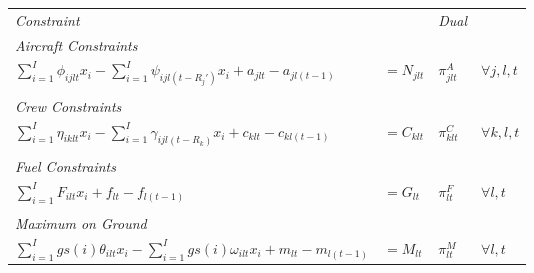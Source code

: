\begin{longtable}[h]{ll|l|l}
{\it Constraint} && {\it Dual} &\\
{\it Aircraft Constraints} &&&\\
$\displaystyle\sum_{i=1}^{I} \phi_{ijlt}x_i - \displaystyle\sum_{i=1}^{I} \psi_{ijl(t-R_{j}')}x_i + a_{jlt} - a_{jl(t-1)}$ & $= N_{jlt}$ &$\pi^A_{jlt}$ & $\forall j,l,t$\\
& & &\\
{\it Crew Constraints} &&& \\
$\displaystyle\sum_{i=1}^{I} \eta_{iklt}x_i - \displaystyle\sum_{i=1}^{I} \gamma_{ijl(t-R_k)}x_i + c_{klt} - c_{kl(t-1)}$ & $= C_{klt}$ &$\pi^C_{klt}$& $\forall k,l,t$ \\ 
& & &\\
{\it Fuel Constraints} &&& \\
$\displaystyle\sum_{i=1}^{I} F_{ilt}x_i + f_{lt} -f_{l(t-1)} $ & $ = G_{lt}$ &$\pi^F_{lt}$ & $\forall l,t$\\
& & &\\
{\it Maximum on Ground} &&& \\
$\displaystyle\sum_{i=1}^{I}gs(i)\theta_{ilt}x_i - \displaystyle\sum_{i=1}^{I}gs(i)\omega_{ilt}x_i + m_{lt} - m_{l(t-1)}$ & $=M_{lt}$ &$\pi^M_{lt}$ & $\forall l,t$ %

\end{longtable}
